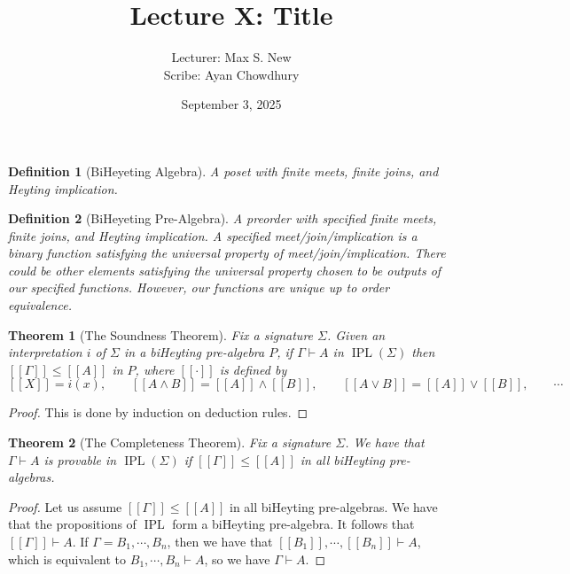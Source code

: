 \documentclass[12pt]{article}
\newtheorem{theorem}{Theorem}
\newtheorem{definition}{Definition}
\DeclareMathOperator{\IPL}{IPL}
\begin{document}
\title{Lecture X: Title}
\author{Lecturer: Max S. New\\ Scribe: Ayan Chowdhury}
\date{September 3, 2025}
\maketitle

\begin{definition}[BiHeyeting Algebra]
    A poset with finite meets, finite joins, and Heyting implication.
\end{definition}

\begin{definition}[BiHeyeting Pre-Algebra]
    A preorder with specified finite meets, finite joins, and Heyting implication. A specified meet/join/implication is a binary function satisfying the universal property of meet/join/implication. There could be other elements satisfying the universal property chosen to be outputs of our specified functions. However, our functions are unique up to order equivalence.
\end{definition}

\begin{theorem}[The Soundness Theorem]
    Fix a signature $\Sigma$. Given an interpretation $i$ of $\Sigma$ in a biHeyting pre-algebra $P$, if $\Gamma \vdash A$ in $\IPL(\Sigma)$ then $[[\Gamma]] \le [[A]]$ in $P$, where $[[\cdot]]$ is defined by 
    \[
        [[X]] = i(x), \quad\quad [[A \land B]] = [[A]] \land [[B]], \quad\quad [[A \lor B]] = [[A]] \lor [[B]], \quad\quad \cdots
    \]
\end{theorem}
\begin{proof}
    This is done by induction on deduction rules. 
\end{proof}

\begin{theorem}[The Completeness Theorem]
    Fix a signature $\Sigma$. We have that $\Gamma \vdash A$ is provable in $\IPL(\Sigma)$ if $[[\Gamma]] \le [[A]]$ in all biHeyting pre-algebras.
\end{theorem}
\begin{proof}
    Let us assume $[[\Gamma]] \le [[A]]$ in all biHeyting pre-algebras. We have that the propositions of $\IPL$ form a biHeyting pre-algebra. It follows that $[[\Gamma]] \vdash A$. If $\Gamma = B_1, \cdots, B_n$, then we have that $[[B_1]], \cdots, [[B_n]] \vdash A$, which is equivalent to $B_1, \cdots, B_n \vdash A$, so we have $\Gamma \vdash A$.
\end{proof}
\end{document}
